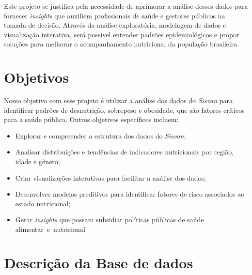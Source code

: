 \documentclass[
	article,			%
	11pt,				%
	oneside,			%
	a4paper,			%
	english,			%
	brazil,				%
	sumario=tradicional
	]{abntex2}
\begin{document}
Este projeto se justifica pela necessidade de aprimorar a análise desses dados para fornecer \textit{insights} que auxiliem profissionais de saúde e gestores públicos na tomada de decisão. Através da análise exploratória, modelagem de dados e visualização interativa, será possível entender padrões epidemiológicos e propor soluções para melhorar o acompanhamento nutricional da população brasileira.







\section{Objetivos}

Nosso objetivo com esse projeto é utilizar a análise dos dados do \textit{Sisvan} para identificar padrões de desnutrição, sobrepeso e obesidade, que são fatores críticos para a saúde pública. Outros objetivos específicos incluem: 
\begin{itemize}
\item Explorar e compreender a estrutura dos dados do \textit{Sisvan};

\item Analisar distribuições e tendências de indicadores nutricionais por região, idade e gênero;

\item Criar visualizações interativas para facilitar a análise dos dados;

\item Desenvolver modelos preditivos para identificar fatores de risco associados ao estado nutricional;

\item Gerar \textit{insights} que possam subsidiar políticas públicas de saúde alimentar e nutricional
\end{itemize}

\section{Descrição da Base de dados}
\end{document}
